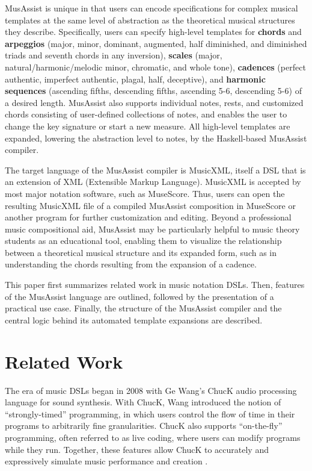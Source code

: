 \documentclass{article}
\begin{document}
MusAssist is unique in that users can encode specifications for complex musical templates at the same level of abstraction as the theoretical musical structures they describe. Specifically,  users can specify high-level templates for 
\textbf{chords} and \textbf{arpeggios} (major, minor, dominant, augmented, half diminished, and diminished triads and seventh chords in any inversion), 
\textbf{scales} (major, natural/harmonic/melodic minor, chromatic, and whole tone), 
\textbf{cadences} (perfect authentic, imperfect authentic, plagal, half, deceptive), and 
\textbf{harmonic sequences} (ascending fifths, descending fifths, ascending 5-6, descending 5-6) of a desired length. MusAssist also supports individual notes, rests, and customized chords consisting of user-defined collections of notes, and enables the user to change the key signature or start a new measure. All high-level templates are expanded, lowering the abstraction level to notes, by the Haskell-based MusAssist compiler.

The target language of the MusAssist compiler is MusicXML, itself a DSL that is an extension of XML (Extensible Markup Language). MusicXML is accepted by most major notation software, such as MuseScore. Thus, users can open the resulting MusicXML file of a compiled MusAssist composition in MuseScore or another program for further customization and editing. Beyond a professional music compositional aid, MusAssist may be particularly helpful to music theory students as an educational tool, enabling them to visualize the relationship between a theoretical musical structure and its expanded form, such as in understanding the chords resulting from the expansion of a cadence. 

This paper first summarizes related work in music notation DSLs. Then, features of the MusAssist language are outlined, followed by the presentation of a practical use case. Finally, the structure of the MusAssist compiler and the central logic behind its automated template expansions are described. 



\section{Related Work}\label{sec:related_work}

The era of music DSLs began in 2008 with Ge Wang’s ChucK audio processing language for sound synthesis. With ChucK, Wang introduced the notion of ``strongly-timed” programming, in which users control the flow of time in their programs to arbitrarily fine granularities. ChucK also supports ``on-the-fly” programming, often referred to as live coding, where users can modify programs while they run. Together, these features allow ChucK to accurately and expressively simulate music performance and creation \cite{wang_2008}. 
\end{document}

